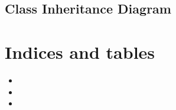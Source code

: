 \documentclass[letterpaper,10pt,english]{sphinxmanual}
\begin{document}
\section{Class Inheritance Diagram}
\label{\detokenize{index:class-inheritance-diagram}}

\chapter{Indices and tables}
\label{\detokenize{index:indices-and-tables}}\begin{itemize}
\item {} 
\sphinxAtStartPar
{}

\item {} 
\sphinxAtStartPar
{}

\item {} 
\sphinxAtStartPar
{}

\end{itemize}


\renewcommand{\indexname}{Python Module Index}
\begin{sphinxtheindex}
\let\bigletter\sphinxstyleindexlettergroup
\bigletter{m}
\item\relax{}
\end{sphinxtheindex}

\renewcommand{\indexname}{Index}
\printindex
\end{document}
